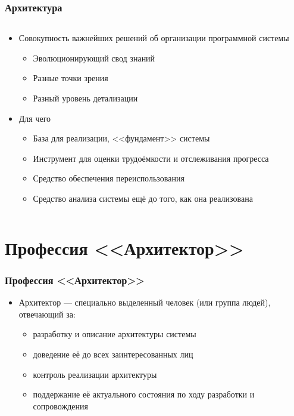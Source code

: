 \documentclass{../mcsslides}
\begin{document}
    \begin{frame}
        \frametitle{Архитектура}
        \begin{columns}
            \begin{column}{0.7\textwidth}
                \begin{itemize}
                    \item Совокупность важнейших решений об организации программной системы
                    \begin{itemize}
                        \item Эволюционирующий свод знаний
                        \item Разные точки зрения
                        \item Разный уровень детализации
                    \end{itemize}
                    \item Для чего
                    \begin{itemize}
                        \item База для реализации, <<фундамент>> системы
                        \item Инструмент для оценки трудоёмкости и отслеживания прогресса
                        \item Средство обеспечения переиспользования
                        \item Средство анализа системы ещё до того, как она реализована
                    \end{itemize}
                \end{itemize}
            \end{column}
            \begin{column}{0.3\textwidth}
            \end{column}
        \end{columns}
    \end{frame}

    \section{Профессия <<Архитектор>>}

    \begin{frame}
        \frametitle{Профессия <<Архитектор>>}
        \begin{itemize}
            \item Архитектор --- специально выделенный человек (или группа людей), отвечающий за:
            \begin{itemize}
                \item разработку и описание архитектуры системы
                \item доведение её до всех заинтересованных лиц
                \item контроль реализации архитектуры
                \item поддержание её актуального состояния по ходу разработки и сопровождения
            \end{itemize}
        \end{itemize}
    \end{frame}
\end{document}

